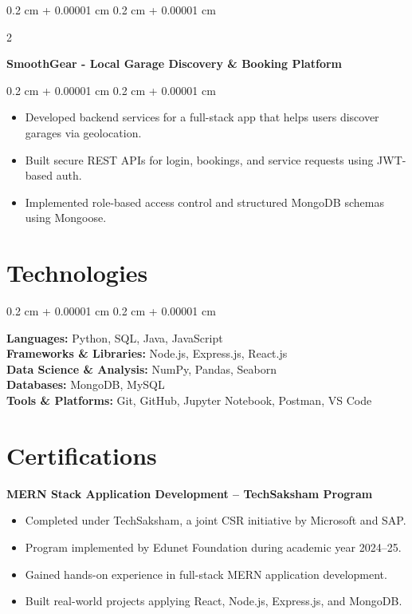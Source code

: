 \documentclass[10pt, letterpaper]{article}
\newenvironment{highlights}{
    \begin{itemize}[
        topsep=0.10 cm,
        parsep=0.10 cm,
        partopsep=0pt,
        itemsep=0pt,
        leftmargin=0.4 cm + 10pt
    ]
}{
    \end{itemize}
} %
\newenvironment{onecolentry}{
    \begin{adjustwidth}{
        0.2 cm + 0.00001 cm
    }{
        0.2 cm + 0.00001 cm
    }
}{
    \end{adjustwidth}
} %
\newenvironment{twocolentry}[2][]{
    \onecolentry
    \def\secondColumn{#2}
    \setcolumnwidth{\fill, 4.5 cm}
    \begin{paracol}{2}
}{
    \switchcolumn \raggedleft \secondColumn
    \end{paracol}
    \endonecolentry
} %
\begin{document}
\vspace{0.2 cm}

\begin{twocolentry}{}
    \textbf{SmoothGear - Local Garage Discovery \& Booking Platform}
\end{twocolentry}

\vspace{0.10 cm}
\begin{onecolentry}
    \begin{highlights}
        \item Developed backend services for a full-stack app that helps users discover garages via geolocation.
        \item Built secure REST APIs for login, bookings, and service requests using JWT-based auth.
        \item Implemented role-based access control and structured MongoDB schemas using Mongoose.
    \end{highlights}
\end{onecolentry}

\section{Technologies}
\begin{onecolentry}
    \textbf{Languages:} Python, SQL, Java, JavaScript\\[0.2cm]
    \textbf{Frameworks \& Libraries:} Node.js, Express.js, React.js\\[0.2cm]
    \textbf{Data Science \& Analysis:} NumPy, Pandas, Seaborn\\[0.2cm]
    \textbf{Databases:} MongoDB, MySQL\\[0.2cm]
    \textbf{Tools \& Platforms:} Git, GitHub, Jupyter Notebook, Postman, VS Code
\end{onecolentry}

\section{Certifications}

\textbf{MERN Stack Application Development – TechSaksham Program}
\begin{highlights}
    \item Completed under TechSaksham, a joint CSR initiative by Microsoft and SAP.
    \item Program implemented by Edunet Foundation during academic year 2024–25.
    \item Gained hands-on experience in full-stack MERN application development.
    \item Built real-world projects applying React, Node.js, Express.js, and MongoDB.
\end{highlights}
\end{document}
